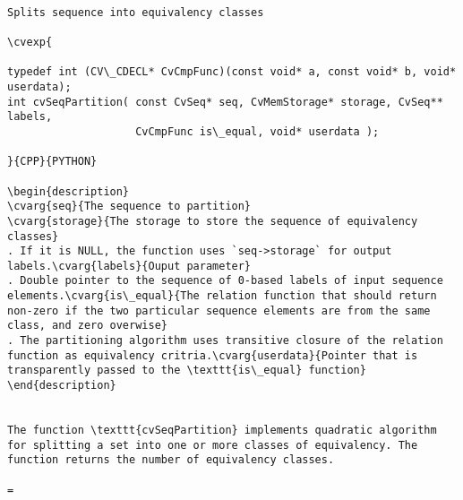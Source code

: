 \label{SeqPartition}
\begin{verbatim}

Splits sequence into equivalency classes

\cvexp{

typedef int (CV\_CDECL* CvCmpFunc)(const void* a, const void* b, void* userdata);
int cvSeqPartition( const CvSeq* seq, CvMemStorage* storage, CvSeq** labels,
                    CvCmpFunc is\_equal, void* userdata );

}{CPP}{PYTHON}

\begin{description}
\cvarg{seq}{The sequence to partition}
\cvarg{storage}{The storage to store the sequence of equivalency classes}
. If it is NULL, the function uses `seq->storage` for output labels.\cvarg{labels}{Ouput parameter}
. Double pointer to the sequence of 0-based labels of input sequence elements.\cvarg{is\_equal}{The relation function that should return non-zero if the two particular sequence elements are from the same class, and zero overwise}
. The partitioning algorithm uses transitive closure of the relation function as equivalency critria.\cvarg{userdata}{Pointer that is transparently passed to the \texttt{is\_equal} function}
\end{description}


The function \texttt{cvSeqPartition} implements quadratic algorithm for splitting a set into one or more classes of equivalency. The function returns the number of equivalency classes.

=\end{verbatim}
\label{Example. Partitioning 2d point set.}
